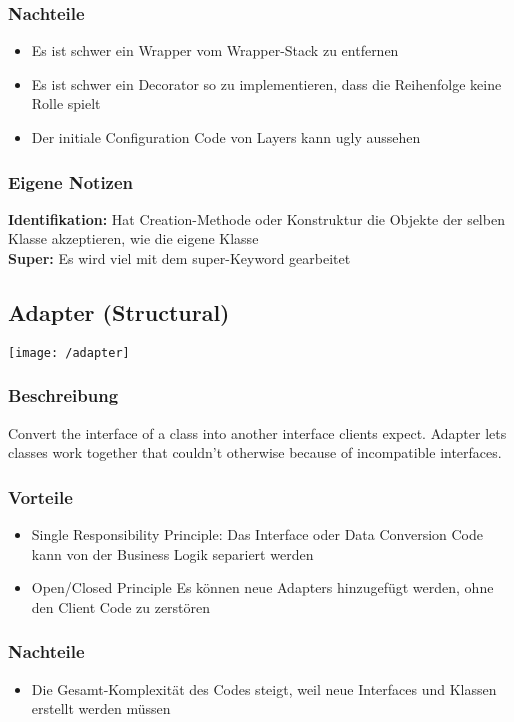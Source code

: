 \subsubsection{Nachteile}
\begin{itemize}[topsep=0pt]
    \itemsep -0.4em
    \item Es ist schwer ein Wrapper vom Wrapper-Stack zu entfernen
    \item Es ist schwer ein Decorator so zu implementieren, dass die Reihenfolge keine Rolle spielt
    \item Der initiale Configuration Code von Layers kann ugly aussehen
\end{itemize}
\subsubsection{Eigene Notizen}
\textbf{Identifikation:} Hat Creation-Methode oder Konstruktur die Objekte der selben Klasse akzeptieren, wie die eigene Klasse\\
\textbf{Super:} Es wird viel mit dem super-Keyword gearbeitet

\subsection{Adapter (Structural)}
\texttt{[image: /adapter]}
\subsubsection{Beschreibung}
Convert the interface of a class into another interface clients expect. Adapter lets classes work together that couldn't otherwise because of incompatible interfaces.
\subsubsection{Vorteile}
\begin{itemize}[topsep=0pt]
    \itemsep -0.4em
    \item Single Responsibility Principle: Das Interface oder Data Conversion Code kann von der Business Logik separiert werden
    \item Open/Closed Principle Es können neue Adapters hinzugefügt werden, ohne den Client Code zu zerstören
\end{itemize}
\subsubsection{Nachteile}
\begin{itemize}[topsep=0pt]
    \itemsep -0.4em
    \item Die Gesamt-Komplexität des Codes steigt, weil neue Interfaces und Klassen erstellt werden müssen
\end{itemize}
